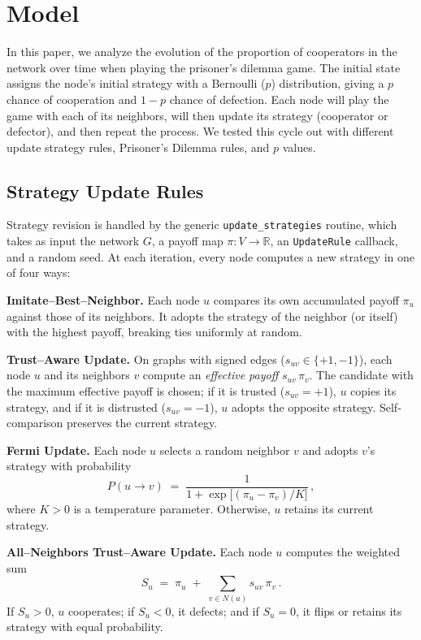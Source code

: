 \section{Model}

In this paper, we analyze the evolution of the proportion of cooperators in the network over time when playing the prisoner's dilemma game. The initial state assigns the node’s initial strategy with a Bernoulli (\(p\)) distribution, giving a \(p\) chance of cooperation and \(1-p\) chance of defection. Each node will play the game with each of its neighbors, will then update its strategy (cooperator or defector), and then repeat the process. We tested this cycle out with different update strategy rules, Prisoner's Dilemma rules, and \(p\) values. 

\subsection{Strategy Update Rules}

Strategy revision is handled by the generic \texttt{update\_strategies} routine, which takes as input the network $G$, a payoff map $\pi:V\to\mathbb{R}$, an \texttt{UpdateRule} callback, and a random seed.  At each iteration, every node computes a new strategy in one of four ways:

\medskip
\noindent\textbf{Imitate–Best–Neighbor.}
Each node $u$ compares its own accumulated payoff $\pi_u$ against those of its neighbors.  It adopts the strategy of the neighbor (or itself) with the highest payoff, breaking ties uniformly at random.

\medskip
\noindent\textbf{Trust–Aware Update.}
On graphs with signed edges ($s_{uv}\in\{+1,-1\}$), each node $u$ and its neighbors $v$ compute an \emph{effective payoff} $s_{uv}\,\pi_v$.  The candidate with the maximum effective payoff is chosen; if it is trusted ($s_{uv}=+1$), $u$ copies its strategy, and if it is distrusted ($s_{uv}=-1$), $u$ adopts the opposite strategy.  Self‐comparison preserves the current strategy.

\medskip
\noindent\textbf{Fermi Update.}
Each node $u$ selects a random neighbor $v$ and adopts $v$’s strategy with probability
\[
  P(u\to v)\;=\;\frac{1}{1+\exp\bigl[(\pi_u-\pi_v)/K\bigr]}\,,
\]
where $K>0$ is a temperature parameter.  Otherwise, $u$ retains its current strategy.

\medskip
\noindent\textbf{All–Neighbors Trust–Aware Update.}
Each node $u$ computes the weighted sum
\[
  S_u \;=\;\pi_u \;+\;\sum_{v\in N(u)} s_{uv}\,\pi_v\,.
\]
If $S_u>0$, $u$ cooperates; if $S_u<0$, it defects; and if $S_u=0$, it flips or retains its strategy with equal probability.  


